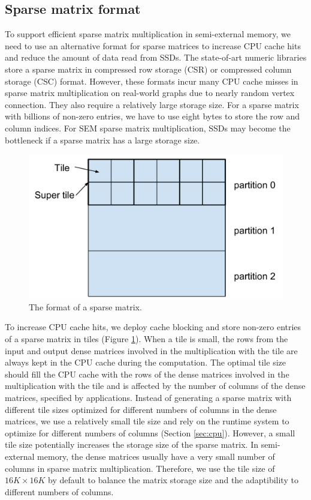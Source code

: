 \subsection{Sparse matrix format}
To support efficient sparse matrix multiplication in semi-external memory,
we need to use an alternative format for sparse matrices to increase CPU cache
hits and reduce the amount of data read from SSDs.
The state-of-art numeric libraries store a sparse matrix in compressed row storage
(CSR) or compressed column storage (CSC) format. However, these formats incur
many CPU cache misses in sparse matrix multiplication on real-world graphs
due to nearly random vertex connection. They also require a relatively large
storage size. For a sparse matrix with billions of non-zero entries, we have
to use eight bytes to store the row and column indices. For SEM sparse
matrix multiplication, SSDs may become the bottleneck if a sparse matrix has
a large storage size.

\begin{figure}
\centering
\includegraphics[scale=0.3]{SpMM_figs/sparse_mat.pdf}
\caption{The format of a sparse matrix.}
\label{sparse_mat}
\end{figure}

To increase CPU cache hits, we deploy cache blocking \cite{Im04} and store
non-zero entries of a sparse matrix in tiles (Figure \ref{sparse_mat}).
When a tile is small, the rows from the input and output dense matrices
involved in the multiplication with the tile are always kept in the CPU cache
during the computation. The optimal tile size should fill the CPU cache
with the rows of the dense matrices involved in the multiplication with
the tile and is affected by the number of columns of the dense matrices,
specified by applications. Instead of generating a sparse matrix with
different tile sizes optimized for different numbers of columns in the dense
matrices, we use a relatively small tile size and rely on the runtime system
to optimize for different numbers of columns (Section \ref{sec:cpu}).
However, a small tile size potentially increases the storage size of the sparse
matrix. In semi-external memory, the dense matrices usually have
a very small number of columns in sparse matrix multiplication. Therefore, we
use the tile size of $16K \times 16K$ by default to balance the matrix storage
size and the adaptibility to different numbers of columns.

